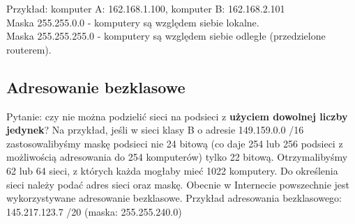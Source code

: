\documentclass[../main.tex]{subfiles}
\begin{document}
    Przykład: komputer A: 162.168.1.100, komputer B: 162.168.2.101\\
    Maska 255.255.0.0 - komputery są względem siebie lokalne.\\
    Maska 255.255.255.0 - komputery są względem siebie odległe (przedzielone routerem).

    \subsection{Adresowanie bezklasowe}
    Pytanie: czy nie można podzielić sieci na podsieci
    z \textbf{użyciem dowolnej liczby jedynek}? Na przykład, jeśli w sieci klasy B o
    adresie 149.159.0.0 /16 zastosowalibyśmy maskę podsieci nie 24 bitową (co daje 254 lub
    256 podsieci z możliwością adresowania do 254 komputerów) tylko 22 bitową.
    Otrzymalibyśmy 62 lub 64 sieci, z których każda mogłaby mieć 1022 komputery. Do określenia sieci należy podać adres
    sieci oraz maskę. Obecnie w Internecie powszechnie jest wykorzystywane adresowanie
    bezklasowe.
    Przykład adresowania bezklasowego: 145.217.123.7 /20 (maska: 255.255.240.0)
\end{document}
